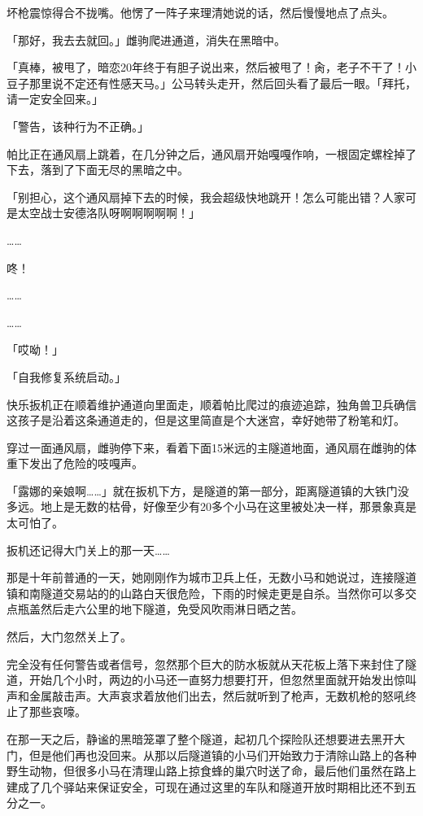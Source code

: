坏枪震惊得合不拢嘴。他愣了一阵子来理清她说的话，然后慢慢地点了点头。

「那好，我去去就回。」雌驹爬进通道，消失在黑暗中。

「真棒，被甩了，暗恋20年终于有胆子说出来，然后被甩了！肏，老子不干了！小豆子那里说不定还有性感天马。」公马转头走开，然后回头看了最后一眼。「拜托，请一定安全回来。」

\horizonline


「{\mt 警告，该种行为不正确。}」

帕比正在通风扇上跳着，在几分钟之后，通风扇开始嘎嘎作响，一根固定螺栓掉了下去，落到了下面无尽的黑暗之中。

「别担心，这个通风扇掉下去的时候，我会超级快地跳开！怎么可能出错？人家可是太空战士安德洛队呀啊啊啊啊啊！」

……

咚！

……

……

「哎呦！」

「{\mt 自我修复系统启动。}」

\horizonline


快乐扳机正在顺着维护通道向里面走，顺着帕比爬过的痕迹追踪，独角兽卫兵确信这孩子是沿着这条通道走的，但是这里简直是个大迷宫，幸好她带了粉笔和灯。

穿过一面通风扇，雌驹停下来，看着下面15米远的主隧道地面，通风扇在雌驹的体重下发出了危险的吱嘎声。

「露娜的亲娘啊……」就在扳机下方，是隧道的第一部分，距离隧道镇的大铁门没多远。地上是无数的枯骨，好像至少有20多个小马在这里被处决一样，那景象真是太可怕了。

扳机还记得大门关上的那一天……

那是十年前普通的一天，她刚刚作为城市卫兵上任，无数小马和她说过，连接隧道镇和南隧道交易站的的山路白天很危险，下雨的时候走更是自杀。当然你可以多交点瓶盖然后走六公里的地下隧道，免受风吹雨淋日晒之苦。

然后，大门忽然关上了。

完全没有任何警告或者信号，忽然那个巨大的防水板就从天花板上落下来封住了隧道，开始几个小时，两边的小马还一直努力想要打开，但忽然里面就开始发出惊叫声和金属敲击声。大声哀求着放他们出去，然后就听到了枪声，无数机枪的怒吼终止了那些哀嚎。

在那一天之后，静谧的黑暗笼罩了整个隧道，起初几个探险队还想要进去黑开大门，但是他们再也没回来。从那以后隧道镇的小马们开始致力于清除山路上的各种野生动物，但很多小马在清理山路上掠食蜂的巢穴时送了命，最后他们虽然在路上建成了几个驿站来保证安全，可现在通过这里的车队和隧道开放时期相比还不到五分之一。

